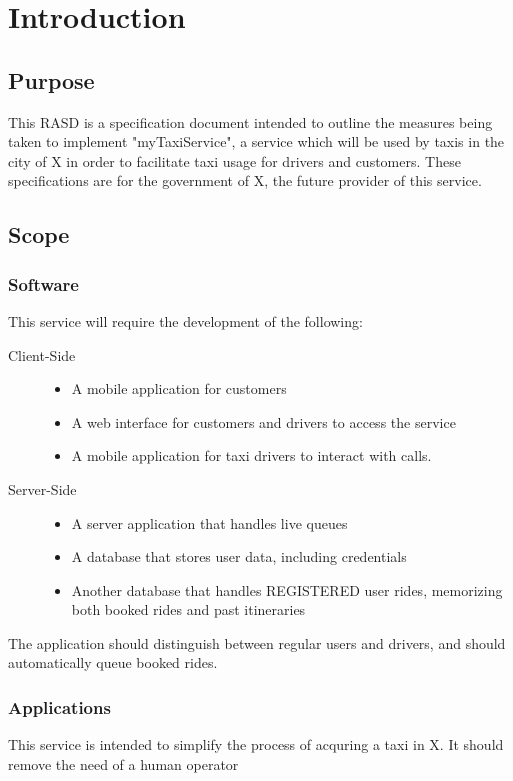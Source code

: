 \section{Introduction}

\subsection{Purpose}
	This RASD is a specification document intended to outline the measures being taken to implement "myTaxiService", a service which will be used
	by taxis in the city of X in order to facilitate taxi usage for drivers and customers. These specifications are for the government of X, the
	future provider of this service.
\subsection{Scope}
	\subsubsection{Software}
		This service will require the development of the following:
		\begin{description}
			\item[Client-Side]
				\begin{itemize}
					\item A mobile application for customers
					\item A web interface for customers and drivers to access the service
					\item A mobile application for taxi drivers to interact with calls.
				\end{itemize}
			\item[Server-Side]
				\begin{itemize}
					\item A server application that handles live queues
					\item A database that stores user data, including credentials
					\item Another database that handles REGISTERED user rides, memorizing both booked rides and past itineraries
				\end{itemize}
		\end{description}
		The application should distinguish between regular users and drivers, and should automatically queue booked rides.
	\subsubsection{Applications}
		This service is intended to simplify the process of acquring a taxi in X. It should remove the need of a human operator

